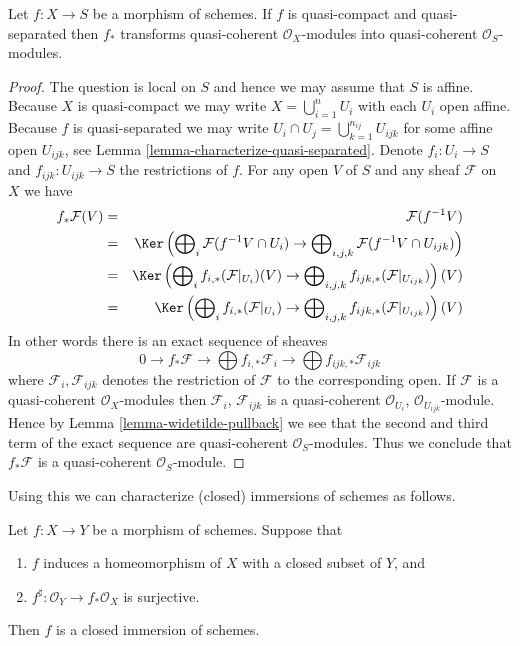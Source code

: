 \begin{lemma}
\label{lemma-push-forward-quasi-coherent}
Let $f : X \to S$ be a morphism of schemes.
If $f$ is quasi-compact and quasi-separated then
$f_*$ transforms quasi-coherent $\mathcal{O}_X$-modules
into quasi-coherent $\mathcal{O}_S$-modules.
\end{lemma}

\begin{proof}
The question is local on $S$ and hence we may assume that
$S$ is affine. Because $X$ is quasi-compact we may write
$X = \bigcup_{i = 1}^n U_i$ with each $U_i$ open affine.
Because $f$ is quasi-separated we may write
$U_i \cap U_j = \bigcup_{k = 1}^{n_{ij}} U_{ijk}$ for some
affine open $U_{ijk}$, see Lemma \ref{lemma-characterize-quasi-separated}.
Denote $f_i : U_i \to S$ and $f_{ijk} : U_{ijk} \to S$ the
restrictions of $f$. For any open $V$ of $S$ and any sheaf
$\mathcal{F}$ on $X$ we have
\begin{eqnarray*}
f_*\mathcal{F}(V) & = & \mathcal{F}(f^{-1}V) \\
& = &
\Ker\left(
\bigoplus\nolimits_i \mathcal{F}(f^{-1}V \cap U_i)
\to
\bigoplus\nolimits_{i, j, k} \mathcal{F}(f^{-1}V \cap U_{ijk})\right) \\
& = &
\Ker\left(
\bigoplus\nolimits_i f_{i, *}(\mathcal{F}|_{U_i})(V)
\to
\bigoplus\nolimits_{i, j, k} f_{ijk, *}(\mathcal{F}|_{U_{ijk}})\right)(V) \\
& = &
\Ker\left(
\bigoplus\nolimits_i f_{i, *}(\mathcal{F}|_{U_i})
\to
\bigoplus\nolimits_{i, j, k} f_{ijk, *}(\mathcal{F}|_{U_{ijk}})\right)(V)
\end{eqnarray*}
In other words there is an exact sequence of sheaves
$$
0 \to f_*\mathcal{F}
\to \bigoplus f_{i, *}\mathcal{F}_i
\to \bigoplus f_{ijk, *}\mathcal{F}_{ijk}
$$
where $\mathcal{F}_i, \mathcal{F}_{ijk}$ denotes the
restriction of $\mathcal{F}$ to the corresponding open.
If $\mathcal{F}$ is a quasi-coherent $\mathcal{O}_X$-modules
then $\mathcal{F}_i$, $\mathcal{F}_{ijk}$ is a quasi-coherent
$\mathcal{O}_{U_i}$, $\mathcal{O}_{U_{ijk}}$-module.
Hence by Lemma \ref{lemma-widetilde-pullback} we see that the second and
third term of the exact sequence are quasi-coherent
$\mathcal{O}_S$-modules. Thus we conclude that
$f_*\mathcal{F}$ is a quasi-coherent $\mathcal{O}_S$-module.
\end{proof}

\noindent
Using this we can characterize (closed) immersions of schemes
as follows.

\begin{lemma}
\label{lemma-characterize-closed-immersions}
Let $f : X \to Y$ be a morphism of schemes.
Suppose that
\begin{enumerate}
\item $f$ induces a homeomorphism of $X$ with a
closed subset of $Y$, and
\item $f^\sharp : \mathcal{O}_Y \to f_*\mathcal{O}_X$
is surjective.
\end{enumerate}
Then $f$ is a closed immersion of schemes.
\end{lemma}

